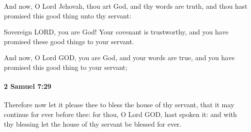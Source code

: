 			\begin{versebox}
					\item[BHS] 
					\item[ASV] And now, O Lord Jehovah, thou art God, and thy words are truth, and thou hast promised this good thing unto thy servant:
					\item[NIV] Sovereign LORD, you are God! Your covenant is trustworthy, and you have promised these good things to your servant.
					\item[NRSV] And now, O Lord GOD, you are God, and your words are true, and you have promised this good thing to your servant;
			\end{versebox}

		\paragraph{2 Samuel 7:29} %
			\label{2SAMUEL-7-29}

			Therefore now let it please thee to bless the house of thy servant, that it may continue for ever before thee: for thou, O Lord GOD, hast spoken it: and with thy blessing let the house of thy servant be blessed for ever.

